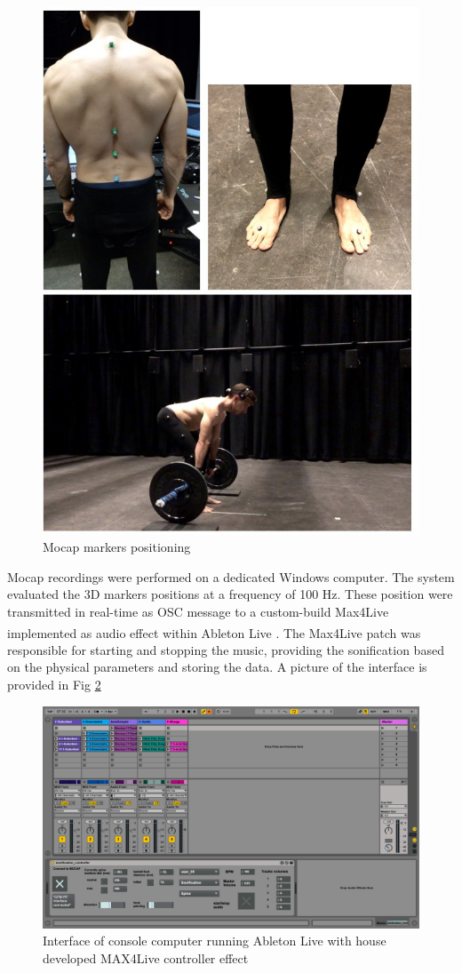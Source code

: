 \documentclass[10pt,letterpaper]{article}
\begin{document}
\begin{figure}[!h]
\center
\includegraphics[width=.8\textwidth]{figures/combination_markers.jpg}
\caption{Mocap markers positioning}
\label{fig:set-up}      
\end{figure}

Mocap recordings were performed on a dedicated Windows computer. The system evaluated the 3D markers positions at a frequency of 100 Hz. These position were transmitted in real-time as OSC message to a custom-build Max4Live implemented as audio effect within Ableton Live\textsuperscript{\textregistered} . The Max4Live patch was responsible for starting and stopping the music, providing the sonification based on the physical parameters and storing the data.
A picture of the interface is provided in Fig \ref{fig:interface}
\begin{figure}[!h]
\center
\includegraphics[width=.6\textwidth]{figures/interface.png}
\caption{Interface of console computer running Ableton Live with house developed MAX4Live controller effect}
\label{fig:interface}      
\end{figure}
\end{document}
